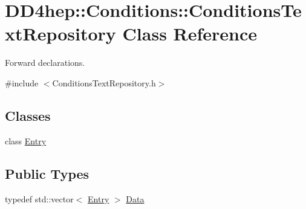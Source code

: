 \hypertarget{class_d_d4hep_1_1_conditions_1_1_conditions_text_repository}{
\section{DD4hep::Conditions::ConditionsTextRepository Class Reference}
\label{class_d_d4hep_1_1_conditions_1_1_conditions_text_repository}
}


Forward declarations.  


{\ttfamily \#include $<$ConditionsTextRepository.h$>$}\subsection*{Classes}
\begin{DoxyCompactItemize}
\item 
class \hyperlink{class_d_d4hep_1_1_conditions_1_1_conditions_text_repository_1_1_entry}{Entry}
\end{DoxyCompactItemize}
\subsection*{Public Types}
\begin{DoxyCompactItemize}
\item 
typedef std::vector$<$ \hyperlink{class_d_d4hep_1_1_conditions_1_1_conditions_text_repository_1_1_entry}{Entry} $>$ \hyperlink{class_d_d4hep_1_1_conditions_1_1_conditions_text_repository_afe5d8989bf0bcd711e59f838943b5115}{Data}
\end{DoxyCompactItemize}
